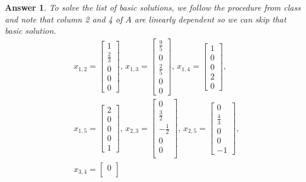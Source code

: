 \documentclass[12pt]{article}
\theoremstyle{colon}
\newtheorem*{answer}{Answer}
\begin{document}
\begin{answer}
  To solve the list of basic solutions, we follow the procedure from class and note that column 2 and 4 of $A$ are linearly dependent so we can skip that basic solution.
  \begin{align*}
    &x_{1,2} = \begin{bmatrix}
      1 \\
      \frac{2}{3} \\
      0 \\
      0 \\
      0
    \end{bmatrix}\text{, } x_{1,3} = \begin{bmatrix}
      \frac{9}{5} \\
      0 \\
      \frac{2}{5} \\
      0 \\
      0
    \end{bmatrix}\text{, } x_{1,4} = \begin{bmatrix}
      1 \\
      0 \\
      0 \\
      2 \\
      0
    \end{bmatrix}\text{, } \\
    &x_{1,5} = \begin{bmatrix}
      2 \\
      0 \\
      0 \\
      0 \\
      1
    \end{bmatrix}\text{, } x_{2,3} = \begin{bmatrix}
      0 \\
      \frac{3}{2} \\
      -\frac{1}{2} \\
      0 \\
      0\\
    \end{bmatrix}\text{, } x_{2,5} = \begin{bmatrix}
      0 \\
      \frac{4}{3} \\
      0 \\
      0 \\
      -1
    \end{bmatrix}\text{, } \\
    &x_{3,4} = \begin{bmatrix}
      0 \\

\end{bmatrix}
\end{align*}
\end{answer}
\end{document}
